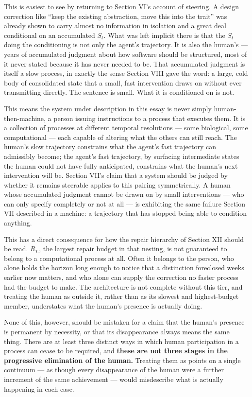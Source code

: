 \documentclass[11pt]{article}
\begin{document}
This is easiest to see by returning to Section VI's account of steering. A design correction like ``keep the existing abstraction, move this into the trait'' was already shown to carry almost no information in isolation and a great deal conditional on an accumulated $S_t$. What was left implicit there is that the $S_t$ doing the conditioning is not only the agent's trajectory. It is also the human's --- years of accumulated judgment about how software should be structured, most of it never stated because it has never needed to be. That accumulated judgment is itself a slow process, in exactly the sense Section VIII gave the word: a large, cold body of consolidated state that a small, fast intervention draws on without ever transmitting directly. The sentence is small. What it is conditioned on is not.

This means the system under description in this essay is never simply human-then-machine, a person issuing instructions to a process that executes them. It is a collection of processes at different temporal resolutions --- some biological, some computational --- each capable of altering what the others can still reach. The human's slow trajectory constrains what the agent's fast trajectory can admissibly become; the agent's fast trajectory, by surfacing intermediate states the human could not have fully anticipated, constrains what the human's next intervention will be. Section VII's claim that a system should be judged by whether it remains steerable applies to this pairing symmetrically. A human whose accumulated judgment cannot be drawn on by small interventions --- who can only specify completely or not at all --- is exhibiting the same failure Section VII described in a machine: a trajectory that has stopped being able to condition anything.

This has a direct consequence for how the repair hierarchy of Section XII should be read. $R_L$, the largest repair budget in that nesting, is not guaranteed to belong to a computational process at all. Often it belongs to the person, who alone holds the horizon long enough to notice that a distinction foreclosed weeks earlier now matters, and who alone can supply the correction no faster process had the budget to make. The architecture is not complete without this tier, and treating the human as outside it, rather than as its slowest and highest-budget member, understates what the human's presence is actually doing.

None of this, however, should be mistaken for a claim that the human's presence is permanent by necessity, or that its disappearance always means the same thing. There are at least three distinct ways in which human participation in a process can cease to be required, and \textbf{these are not three stages in the progressive elimination of the human.} Treating them as points on a single continuum --- as though every disappearance of the human were a further increment of the same achievement --- would misdescribe what is actually happening in each case.
\end{document}

